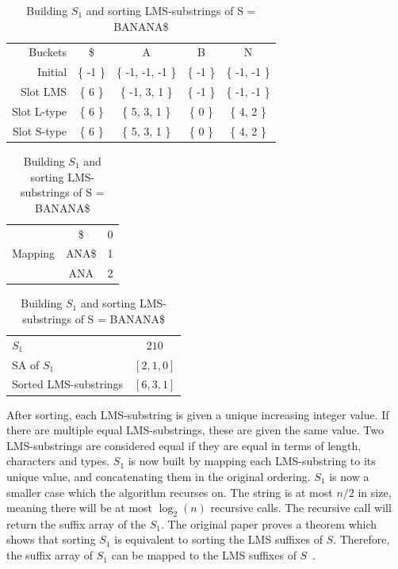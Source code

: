 \begin{table}[t] \begin{center}
		\begin{tabular}[c]{r|cccc} Buckets & \$           & A            & B & N \\ Initial & \{ -1 \} & \{ -1, -1,
               -1 \}               & \{ -1 \}     & \{ -1, -1 \}         \\ Slot LMS & \{  6 \} & \{ -1,  3,  1 \} & \{ -1
               \}                  & \{ -1, -1 \}                        \\ Slot L-type & \{  6 \} & \{  5,  3,  1 \} & \{  0 \} & \{  4, 2
               \}                                                        \\ Slot S-type & \{  6 \} & \{  5,  3,  1 \} & \{  0 \} & \{  4,  2 \}\\\end{tabular}

		\vspace{0.25cm}
		\begin{tabular}[c]{r|c|c}
			        & \$    & 0 \\
			Mapping & ANA\$ & 1 \\
			        & ANA   & 2 \\
		\end{tabular}

		\vspace{0.25cm}

		\begin{tabular}[c]{l|c}
			$S_1$                 & $210$       \\
			SA of $S_1$           & $[2, 1, 0]$ \\
			Sorted LMS-substrings & $[6, 3, 1]$ \\
		\end{tabular}

	\end{center}
	\caption{Building $S_1$ and sorting LMS-substrings of S = BANANA\$}
	\label{tab:bucketinglms}
\end{table}

After sorting, each LMS-substring is given a unique increasing integer value. If there are
multiple equal LMS-substrings, these are given the same value. Two LMS-substrings are
considered equal if they are equal in terms of length, characters and types. $S_1$ is now
built by mapping each LMS-substring to its unique value, and concatenating them in the
original ordering. $S_1$ is now a smaller case which the algorithm recurses on. The string
is at most $n / 2$ in size, meaning there will be at most $\log_2(n)$ recursive calls. The
recursive call will return the suffix array of the $S_1$. The original paper proves a theorem
which shows that sorting $S_1$ is equivalent to sorting the LMS suffixes of $S$.
Therefore, the suffix array of $S_1$ can be mapped to the LMS suffixes of
$S$~\cite{LinearTimeSuffixArraySAIS}.

